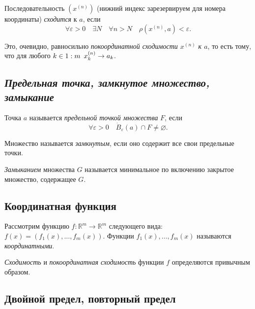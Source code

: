 \begin{definition}
	Последовательность  \((x^{(n)})\) (нижний индекс зарезервируем для номера координаты) \textit{сходится} к \(a\), если \[
	\forall \varepsilon > 0 \quad \exists N \quad \forall n > N \quad \rho(x^{(n)}, a) < \varepsilon.
	\]
	
	Это, очевидно, равносильно \textit{покоординатной сходимости \(x^{(n)}\) к \(a\)}, то есть тому, что для любого \(k \in 1 : m \enskip x_k^{(n)} \to a_k\).
\end{definition}

\subsection{\itshape Предельная точка, замкнутое множество, замыкание}

\begin{definition}
	Точка  \(a\) называется \textit{предельной точкой множества} \(F\), если \[
	\forall \varepsilon > 0 \quad \dot B_\varepsilon (a) \cap F \neq \varnothing.
	\]
	
	Множество называется \textit{замкнутым}, если оно содержит все свои предельные точки.
	
	\textit{Замыканием} множества \(G\) называется минимальное по включению закрытое множество, содержащее \(G\).
\end{definition}

\subsection{Координатная функция}

\begin{definition}
	Рассмотрим функцию \(f \colon \mathbb{R}^m \to \mathbb{R}^m\) следующего вида: \(f(x) = (f_1 (x), \ldots, f_m (x))\). Функции \(f_1 (x), \ldots, f_m (x)\) называются \textit{координатными}.
\end{definition}

\begin{remark}
	\textit{Сходимость} и \textit{покоординатная сходимость} функции \(f\) определяются привычным образом.
\end{remark}

\subsection{Двойной предел, повторный предел}

